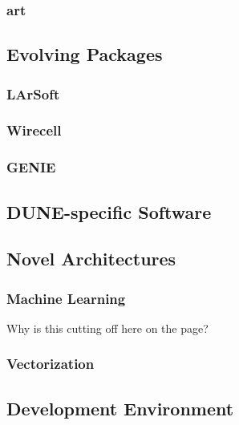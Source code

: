 \subsubsection{art}
\label{ch:exec-comp-sw-int-art}


\subsection{Evolving Packages}	
\label{ch:exec-comp-sw-evpkg}


\subsubsection{LArSoft}
\label{ch:exec-comp-sw-evpkg-larsoft}


\subsubsection{Wirecell}
\label{ch:exec-comp-sw-evpkg-wcell}


\subsubsection{GENIE}
\label{ch:exec-comp-sw-evpkg-genie}


\subsection{DUNE-specific Software}	
\label{ch:exec-comp-sw-evpkg-spec}


\subsection{Novel Architectures}	
\label{ch:exec-comp-sw-novarch}

\subsubsection{Machine Learning}
\label{ch:exec-comp-sw-novarch-mach}
Why is this cutting off here on the page?
\subsubsection{Vectorization}
\label{ch:exec-comp-sw-novarch-vec}

\subsection{Development Environment	}
\label{ch:exec-comp-sw-devenv}

